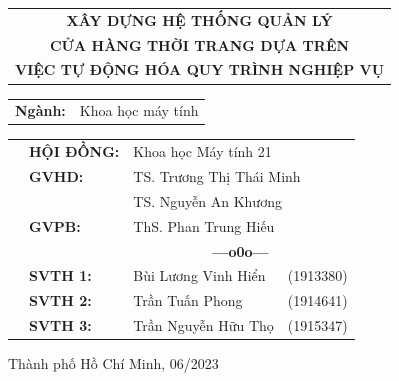 \documentclass[a4paper, oneside, 12pt]{report}
\theoremstyle{definition}
\newcommand{\setupfont}[1]{\fontsize{#1}{#1}\selectfont}
\begin{document}
\begin{titlepage}
	\vspace*{0.5cm}

	\begin{center}
		\setupfont{20pt}
		\begin{tabular}{c}
			\textbf{{XÂY DỰNG HỆ THỐNG QUẢN LÝ}}    \\
			\textbf{{CỬA HÀNG THỜI TRANG DỰA TRÊN}} \\
			\textbf{{VIỆC TỰ ĐỘNG HÓA QUY TRÌNH NGHIỆP VỤ}}
		\end{tabular}
	\end{center}

	\vspace{0.5cm}


	\begin{center}
		\setupfont{15pt}
		\begin{tabular}{rl}
			\textbf{Ngành:} & Khoa học máy tính
		\end{tabular}
	\end{center}

	\vspace{1cm}

	\begin{table}[h]
		\setupfont{15pt}
		\begin{tabular}{rlll}
			\hspace{4.5 cm} & \textbf{HỘI ĐỒNG:} & \multicolumn{2}{l}{ Khoa học Máy tính 21      }                                  \\
			                & \textbf{GVHD:}     & \multicolumn{2}{l}{ TS. Trương Thị Thái Minh                       }             \\
			                &                    & \multicolumn{2}{l}{TS. Nguyễn An Khương                            }             \\
			                & \textbf{GVPB:}     & \multicolumn{2}{l}{ThS. Phan Trung Hiếu                            }             \\
			                &                    & \multicolumn{2}{c}{\bf---o0o---}\vspace{2mm}                                     \\
			                & \textbf{SVTH 1:}   & Bùi Lương Vinh Hiển                                                  & (1913380) \\
			                & \textbf{SVTH 2:}   & Trần Tuấn Phong                                                      & (1914641) \\
			                & \textbf{SVTH 3:}   & Trần Nguyễn Hữu Thọ                                                  & (1915347) \\
		\end{tabular}
	\end{table}
	\vspace{1cm}

	\begin{center}
		{\setupfont{15pt} Thành phố Hồ Chí Minh, 06/2023}
	\end{center}

\end{titlepage}
\end{document}
